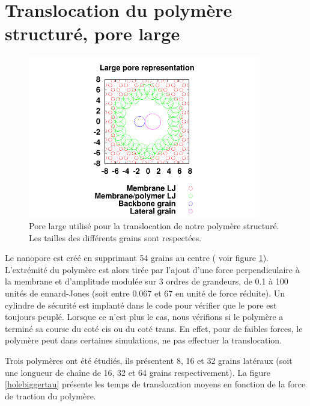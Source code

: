  


\section{Translocation du polymère structuré, pore large}

\begin{figure}[H]
\begin{center}
\includegraphics[width=0.9\textwidth]{largepore.pdf}


\caption[Polymère structuré et pore large]{Pore large utilisé pour la translocation de notre polymère structuré. Les tailles des différents grains sont respectées. }
\label{porelarge}
\end{center}
\end{figure}

  Le nanopore est créé en supprimant 54 grains au centre ( voir figure \ref{porelarge}). L'extrémité du polymère est alors tirée par l'ajout d'une force perpendiculaire à la membrane et d'amplitude modulée sur 3 ordres de grandeurs, de 0.1 à 100 unités de ennard-Jones (soit entre 0.067 et 67 en unité de force réduite). Un cylindre de sécurité est implanté dans le code pour vérifier que le pore est toujours peuplé. Lorsque ce n'est plus le cas, nous vérifions si le polymère a terminé sa course du coté cis ou du coté trans. En effet, pour de faibles forces, le polymère peut dans certaines simulations, ne pas effectuer la translocation.




Trois polymères ont été étudiés, ils présentent 8, 16 et 32 grains latéraux (soit une longueur de cha\^ine de 16, 32 et 64 grains respectivement). La figure \ref{holebiggertau} présente les temps de translocation moyens en fonction de la force de traction du polymère.

